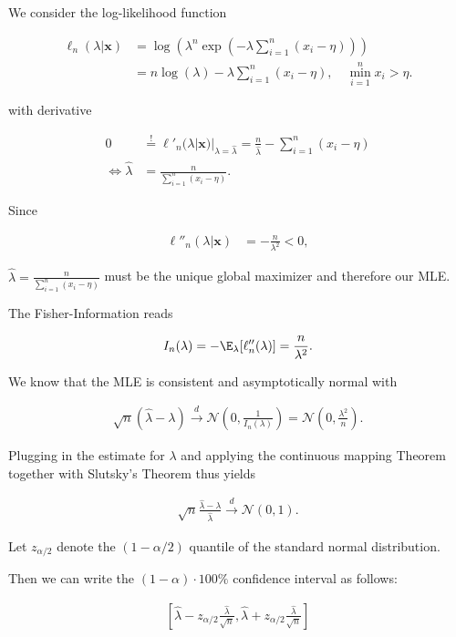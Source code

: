 \begin{solution}

We consider the log-likelihood function

\begin{align*}
  \ell_n(\lambda | \textbf{x}) &= \log\left(\lambda^n \exp\left(-\lambda \sum_{i=1}^n (x_i - \eta)\right)\right) \\
  &= n\log(\lambda) - \lambda\sum_{i=1}^n (x_i - \eta), \quad \min_{i=1}^n x_i > \eta.
\end{align*}

with derivative

\begin{align*}
  0 & \stackrel{!}{=} \ell'_n(\lambda | \textbf{x})|_{\lambda = \hat{\lambda}} 
  = \frac{n}{\hat{\lambda}} - \sum_{i=1}^n (x_i - \eta) \\
  \iff \hat{\lambda} &= \frac{n}{\sum_{i=1}^n (x_i - \eta)}.
\end{align*}

Since

\begin{align*}
  \ell''_n(\lambda | \textbf{x}) &= - \frac{n}{\lambda^2} < 0,
\end{align*}

$\hat{\lambda} = \frac{n}{\sum_{i=1}^n (x_i - \eta)}$ must be the unique
global maximizer and therefore our MLE.

The Fisher-Information reads

\begin{align*}
  I_n(\lambda) 
  = -\E_\lambda[\ell''_n(\lambda)]
  = \frac{n}{\lambda^2}.
\end{align*}

We know that the MLE is consistent and asymptotically normal with

\begin{align*}
  \sqrt{n}(\hat{\lambda} - \lambda) \xrightarrow{d} \mathcal{N}\left(0, \frac{1}{I_n(\lambda)}\right)
  = \mathcal{N}\left(0, \frac{\lambda^2}{n}\right).
\end{align*}

Plugging in the estimate for $\lambda$ and applying the continuous mapping Theorem together with Slutsky's Theorem thus yields

\begin{align*}
  \sqrt{n}\frac{\hat{\lambda} - \lambda}{\hat{\lambda}} \xrightarrow{d} \mathcal{N}(0,1).
\end{align*}

Let $z_{\alpha/2}$ denote the $(1 - \alpha/2)$ quantile of the standard normal distribution.

Then we can write the $(1 - \alpha) \cdot 100 \%$ confidence interval as follows:

\begin{align*}
  \left[\hat{\lambda} - z_{\alpha/2}\frac{\hat{\lambda}}{\sqrt{n}}, \hat{\lambda} + z_{\alpha/2}\frac{\hat{\lambda}}{\sqrt{n}}\right]
\end{align*}

\end{solution}

